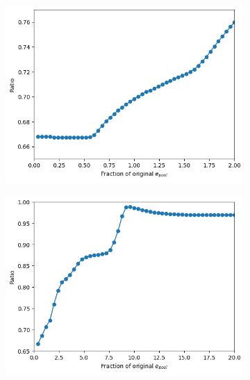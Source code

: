 \begin{figure}
  \centering
  \begin{subfigure}[htpb]{0.45\textwidth}
   \centering
   \includegraphics[width=\textwidth]{epool_ec_ratio_shrinkyaxis}
   \caption{
   }
   \label{fig:model-pool-ratio}
  \end{subfigure}%
  \begin{subfigure}[htpb]{0.45\textwidth}
   \centering
   \includegraphics[width=\textwidth]{epool_ec_ratio_20_shrinkyaxis}
   \caption{
   }
   \label{fig:model-pool-ratio-20}
  \end{subfigure}


\end{figure}
